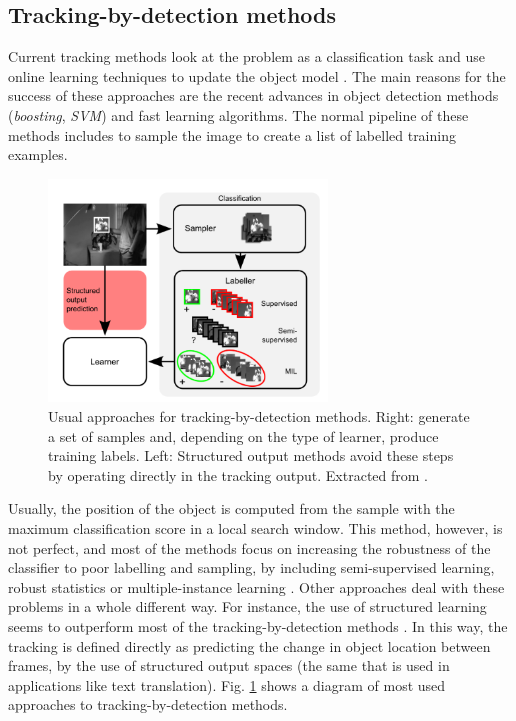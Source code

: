 \subsection{Tracking-by-detection methods}

Current tracking methods look at the problem as a classification task and use online learning techniques to update the object model \cite{c23}. The main reasons for the success of these approaches are the recent advances in object detection
methods ({\it boosting}, {\it SVM}) and fast learning algorithms. 
The normal 
pipeline of these methods includes to 
sample the image to create a list 
of labelled training examples. 

   \begin{figure}[thpb]
      \centering
      \includegraphics[width=0.66\textwidth]{../images/tbd.png}
      \caption{Usual approaches for tracking-by-detection methods. Right: generate a set of samples and, depending on the type of learner, produce training labels. Left: Structured output methods avoid these steps by operating directly in the tracking output. Extracted from \cite{c23}.}
      \label{tr_tbd}
   \end{figure}


Usually, the position of the object 
is computed from the sample with the maximum classification score in a local search window. 
This method, however, is not perfect, and most of the methods 
focus on increasing the robustness 
of the classifier to poor labelling 
and sampling, by including semi-supervised learning, robust statistics or multiple-instance 
learning \cite{c25}. Other approaches deal with these problems 
in a whole different way. For instance, the use of structured learning seems to outperform most 
of the tracking-by-detection methods \cite{c23}. In this way, 
the tracking is defined directly 
as predicting the change in object location between frames, by the use 
of structured output spaces (the same that is used in applications like text translation). Fig. \ref{tr_tbd} shows a diagram of most used approaches to tracking-by-detection methods. 
   
